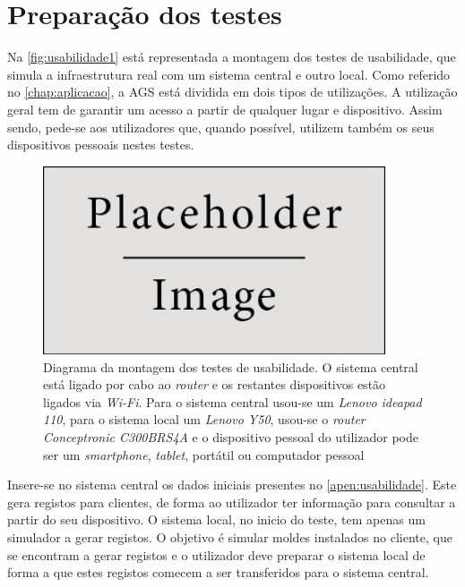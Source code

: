 \documentclass[11pt,twoside,a4paper]{report}
\begin{document}
\section{Preparação dos testes}
Na \autoref{fig:usabilidade1} está representada a montagem dos testes de usabilidade, que simula a infraestrutura real com um sistema central e outro local. Como referido no \autoref{chap:aplicacao}, a AGS está dividida em dois tipos de utilizações. A utilização geral tem de garantir um acesso a partir de qualquer lugar e dispositivo. Assim sendo, pede-se aos utilizadores que, quando possível, utilizem também os seus dispositivos pessoais nestes testes.
\begin{figure}[H]
	\begin{center}
		\includegraphics[width=0.9\textwidth]{placeholder} %
		\caption[Diagrama da montagem dos testes de usabilidade]{Diagrama da montagem dos testes de usabilidade. O sistema central está ligado por cabo ao \textit{router} e os restantes dispositivos estão ligados via \textit{Wi-Fi}. Para o sistema central usou-se um \textit{Lenovo ideapad 110}, para o sistema local um \textit{Lenovo Y50}, usou-se o \textit{router} \textit{Conceptronic C300BRS4A} e o dispositivo pessoal do utilizador pode ser um \textit{smartphone}, \textit{tablet}, portátil ou computador pessoal}
		\label{fig:usabilidade1}
	\end{center}
\end{figure}
Insere-se no sistema central os dados iniciais presentes no \autoref{apen:usabilidade}. Este gera registos para clientes, de forma ao utilizador ter informação para consultar a partir do seu dispositivo. O sistema local, no inicio do teste, tem apenas um simulador a gerar registos. O objetivo é simular moldes instalados no cliente, que se encontram a gerar registos e o utilizador deve preparar o sistema local de forma a que estes registos comecem a ser transferidos para o sistema central.
\end{document}
